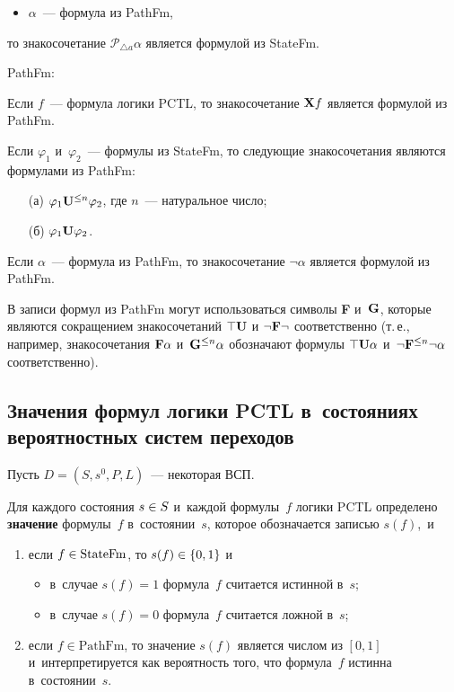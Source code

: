 \begin{multicols}{2}
\begin{itemize}
    \item $\alpha$~--- формула из PathFm,
\end{itemize}
то знакосочетание $\mathcal{P}_{\triangle a} \alpha$ является формулой из StateFm.
\en

PathFm:

\smallskip

\bn
\item Если $f$~--- формула логики PCTL, то  знакосочетание ${\bf X}f$
является формулой из PathFm.
\item Если $\varphi_1$ и~$\varphi_2$~--- формулы
из StateFm, то  следующие знакосочетания являются формулами из PathFm:
\begin{itemize}
\item[(а)] $\varphi_1{\bf U}^{\leq n}\varphi_2$,
где $n$~--- натуральное число;
\item[(б)] $\varphi_1{\bf U}\varphi_2$.
\end{itemize}
\item Если $\alpha$~--- формула из PathFm,
то знакосочетание $\neg \alpha$ является формулой
из PathFm.
\en

В записи формул из PathFm могут использоваться символы {\bf F} и~${\bf G}$,
которые являются сокращением знакосочетаний $\top{\bf U}$
и $\neg{\bf F} \neg$ соответственно (т.\,е., например, знакосочетания
 ${\bf F} \alpha$ и~${\bf G}^{\leq n}\alpha$
обозначают формулы
$\top{\bf U} \alpha$ и~$\neg {\bf F}^{\leq n}\neg \alpha$
соответственно).

\subsection{Значения формул логики PCTL
в~состояниях вероятностных систем переходов}
\label{dsfgdsfgdfgdfgdsf445}

Пусть $D=(S, s^0, P, L)$~--- некоторая ВСП.

Для каждого состояния $s\hm\in S$ и~каждой фо\-р\-му\-лы~$f$ логики PCTL
определено {\bf значение} формулы~$f$ в~состоянии~$s$, которое обозначается
записью $s(f)$,~и
\begin{enumerate}[(1)]
\item если $f\hm\in \mathrm{StateFm}$, то $s(f) \hm\in \{0,1\}$
   и
   \begin{itemize}
   \item в~случае $s(f)=1$  формула~$f$ считается
   истинной в~$s$;
   \item в~случае $s(f)=0$
   формула~$f$ считается  ложной в~$s$;
   \end{itemize}
\item если $f\in \mathrm{PathFm}$, то значение
$s(f)$ является числом из  $[0,1]$ и~интерпретируется
как вероятность того, что  формула~$f$ истинна в~состоянии~$s$.
\end{enumerate}


\end{multicols}
